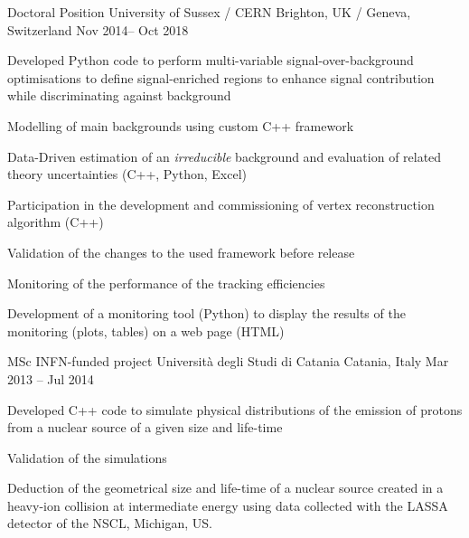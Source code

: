   \begin{cventries}    
    \cventry
    {Doctoral Position}
    {University of Sussex / CERN}
    {Brighton, UK / Geneva, Switzerland}
    {Nov 2014-- Oct 2018}
    {
    \begin{cvitems}
      \item Developed Python code to perform multi-variable signal-over-background optimisations to define signal-enriched regions to enhance signal contribution while discriminating against background
      \item Modelling of main backgrounds using custom C++ framework
      \item Data-Driven estimation of an \emph{irreducible} background and evaluation of related theory uncertainties (C++, Python, Excel)
      \item Participation in the development and commissioning of vertex reconstruction algorithm (C++)
      \item Validation of the changes to the used framework before release
      \item Monitoring of the performance of the tracking efficiencies
      \item Development of a monitoring tool (Python) to display the results of the monitoring (plots, tables) on a web page (HTML)
    \end{cvitems}
    }
  \end{cventries}

  \begin{cventries}    
    \cventry
    {MSc INFN-funded project}
    {Università degli Studi di Catania}
    {Catania, Italy}
    {Mar 2013 -- Jul 2014}
    {
    \begin{cvitems}
      \item Developed C++ code to simulate physical distributions of the emission of protons from a nuclear source of a given size and life-time
      \item Validation of the simulations
      \item Deduction of the geometrical size and life-time of a nuclear source created in a heavy-ion collision at intermediate energy using data collected with the LASSA detector of the NSCL, Michigan, US.
    \end{cvitems}
    }
  \end{cventries}
